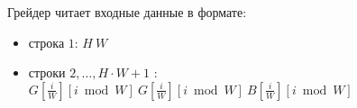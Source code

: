 Грейдер читает входные данные в формате:
\begin{itemize}
\item строка $1$: $H\ W$
\item строки $2, \dots, H \cdot W + 1$ : $G[\frac{i}{W}][i \bmod W]\ G[\frac{i}{W}][i \bmod W]\ B[\frac{i}{W}][i \bmod W]$
\end{itemize}

